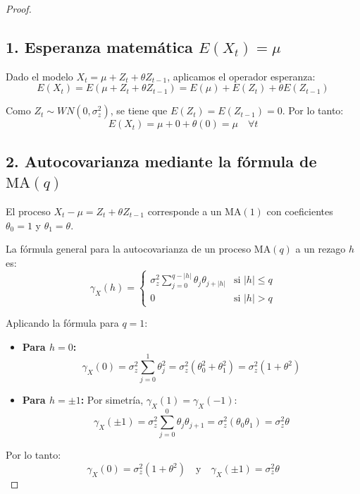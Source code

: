 \documentclass[11pt,letterpaper]{article}
\begin{document}
\begin{proof}

\subsection*{1. Esperanza matemática $E(X_t) = \mu$}

Dado el modelo $X_t = \mu + Z_t + \theta Z_{t-1}$, aplicamos el operador esperanza:
\[
E(X_t) = E(\mu + Z_t + \theta Z_{t-1}) = E(\mu) + E(Z_t) + \theta E(Z_{t-1})
\]

Como $Z_t \sim WN(0, \sigma_z^2)$, se tiene que $E(Z_t) = E(Z_{t-1}) = 0$. Por lo tanto:
\[
E(X_t) = \mu + 0 + \theta(0) = \mu \quad \forall t
\]

\subsection*{2. Autocovarianza mediante la fórmula de $\text{MA}(q)$}

El proceso $X_t - \mu = Z_t + \theta Z_{t-1}$ corresponde a un $\text{MA}(1)$ con coeficientes $\theta_0 = 1$ y $\theta_1 = \theta$.

La fórmula general para la autocovarianza de un proceso $\text{MA}(q)$ a un rezago $h$ es:
\[
\gamma_X(h) = 
\begin{cases} 
\sigma_z^2 \displaystyle\sum_{j=0}^{q - |h|} \theta_j \theta_{j+|h|} & \text{si } |h| \le q \\ 
0 & \text{si } |h| > q 
\end{cases}
\]

Aplicando la fórmula para $q = 1$:

\begin{itemize}
    \item \textbf{Para $h = 0$:}
    \[
    \gamma_X(0) = \sigma_z^2 \sum_{j=0}^{1} \theta_j^2 = \sigma_z^2 (\theta_0^2 + \theta_1^2) = \sigma_z^2(1 + \theta^2)
    \]

    \item \textbf{Para $h = \pm 1$:}
    Por simetría, $\gamma_X(1) = \gamma_X(-1)$:
    \[
    \gamma_X(\pm 1) = \sigma_z^2 \sum_{j=0}^{0} \theta_j \theta_{j+1} = \sigma_z^2 (\theta_0 \theta_1) = \sigma_z^2 \theta
    \]
\end{itemize}

Por lo tanto:
\[
\gamma_X(0) = \sigma_z^2(1 + \theta^2) \quad \text{y} \quad \gamma_X(\pm 1) = \sigma_z^2 \theta 
\]
\end{proof}
\end{document}
